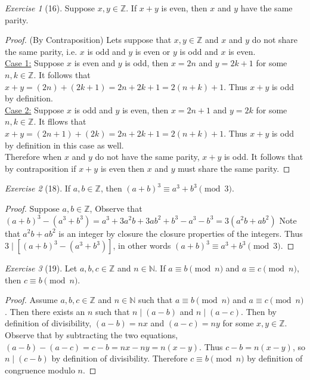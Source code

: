 \documentclass[12pt]{amsart}
\theoremstyle{remark}
\newtheorem*{exercise}{Exercise}%
\def\NN{\ensuremath{\mathbb N}}
\def\ZZ{\ensuremath{\mathbb Z}}
\theoremstyle{mycomment}
\begin{document}
\begin{exercise}[16] Suppose $x,y\in\ZZ$. If $x+y$ is even, then $x$ and $y$ have the same parity.
\begin{proof}
	(By Contraposition) Lets suppose that $x,y\in\ZZ$ and $x$ and $y$ do not share the same parity, i.e. $x$ is odd and $y$ is even or $y$ is odd and $x$ is even. \\
\underline{Case 1:} Suppose $x$ is even and $y$ is odd, then $x=2n$ and $y = 2k+1$ for some $n,k\in\ZZ$. It follows that $x + y = (2n) + (2k+1) = 2n + 2k + 1 = 2(n+k)+1$. Thus $x+y$ is odd by definition. \\
\underline{Case 2:} Suppose $x$ is odd and $y$ is even, then $x = 2n+1$ and $y = 2k$ for some $n,k\in\ZZ$. It fllows that $x + y = (2n+1) + (2k) = 2n + 2k + 1 = 2(n + k) + 1$. Thus $x + y$ is odd by definition in this case as well. \\
Therefore when $x$ and $y$ do not have the same parity, $x+y$ is odd. It follows that by contraposition if $x+y$ is even then $x$ and $y$ must share the same parity.
\end{proof}
\end{exercise}

\begin{exercise}[18] If $a,b\in\ZZ$, then $(a+b)^{3}\equiv a^{3}+b^{3}\pmod 3$. %
\begin{proof}
	Suppose $a,b\in\ZZ$, Observe that $(a+b)^3 - (a^3 + b^3) = a^3 + 3a^2b + 3ab^2 + b^3 - a^3 - b^3 = 3(a^2b + ab^2)$ Note that $a^2b + ab^2$ is an integer by closure the closure properties of the integers. Thus $3 \mid [(a+b)^3 - (a^3 + b^3)]$, in other words $(a+b)^{3}\equiv a^{3}+b^{3}\pmod 3$.
\end{proof}
\end{exercise}

\begin{exercise}[19] Let $a,b,c\in\ZZ$ and $n\in\NN$. If $a\equiv b\pmod n$ and $a\equiv c\pmod n$, then $c\equiv b\pmod n$.
\begin{proof}
	Assume $a, b, c \in \ZZ$ and $n\in\NN$ such that $a\equiv b \pmod n$ and $a\equiv c\pmod n$. Then there exists an $n$ such that $n \mid (a - b)$ and $n \mid (a - c)$. Then by definition of divisibility, $(a-b) = nx$ and $(a-c) = ny$ for some $x,y \in \ZZ$. Observe that by subtracting the two equations, $(a-b) - (a - c) = c - b = nx - ny = n(x - y)$. Thus $c-b = n(x-y)$, so $n \mid (c - b)$ by definition of divisibility. Therefore $c \equiv b \pmod n$ by definition of congruence modulo $n$.
\end{proof}
\end{exercise}
\end{document}
